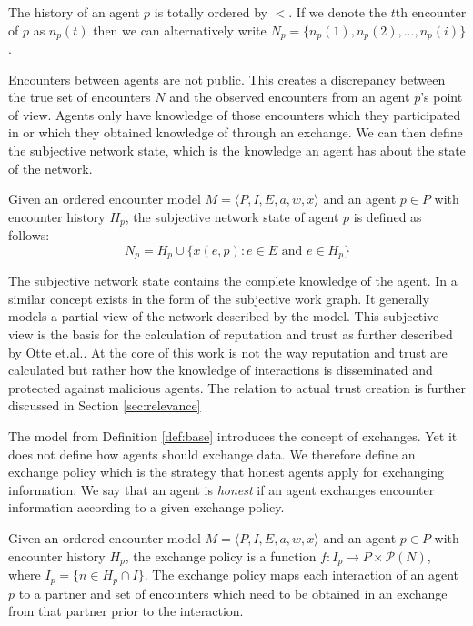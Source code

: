 The history of an agent $p$ is totally ordered by $<$. If we denote the 
$t$th encounter of $p$ as $n_p(t)$ then we can alternatively write $N_p = \{ n_p(1), n_p(2), ..., n_p(i)\}$.

Encounters between agents are not public. This creates a discrepancy between the true set of 
encounters $N$ and the observed encounters from an agent $p$'s point of view. Agents only have 
knowledge of those encounters which they participated in or which they obtained knowledge of through an exchange.
We can then define the subjective network state, which is the knowledge an agent has about the state of
the network.

\begin{defn}
    \label{def:subjective_network_state}
    Given an ordered encounter model $M = \langle P, I, E, a, w, x \rangle$ and an agent $p \in P$ with encounter history $H_p$, the subjective network state of agent $p$
    is defined as follows:
    \begin{equation}
        N_p = H_p \cup \{ x(e, p) : e \in E \text{ and } e \in H_p \}
    \end{equation}
\end{defn}

The subjective network state contains the complete knowledge of the agent. In \cite{OTTE2017} a 
similar concept exists in the form of the subjective work graph. It generally models a partial view
of the network described by the model. This subjective view is the basis for the calculation of 
reputation and trust as further described by Otte et.al.. At the core of this work is not the way 
reputation and trust are calculated but rather how the knowledge of interactions is disseminated and
protected against malicious agents. The relation to actual trust creation is further discussed in 
Section \ref{sec:relevance}

The model from Definition \ref{def:base} introduces the concept of exchanges. Yet it does not define
how agents should exchange data. We therefore define an exchange policy which is the strategy that 
honest agents apply for exchanging information. We say that an agent is \textit{honest} if an agent
exchanges encounter information according to a given exchange policy.

\begin{defn}
    Given an ordered encounter model $M = \langle P, I, E, a, w, x \rangle$ and an agent $p \in P$ with encounter history $H_p$,
    the exchange policy is a function $f : I_p \rightarrow P \times \mathcal{P}(N)$, where $I_p = \{ n \in H_p  \cap I\}$.
    The exchange policy maps each interaction of an agent $p$ to a partner and set of encounters 
    which need to be obtained in an exchange from that partner prior to the interaction. 
\end{defn}

